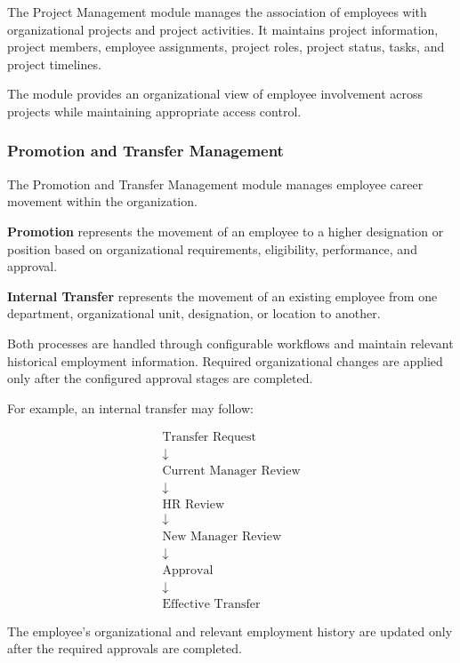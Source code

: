 \documentclass[12pt,a4paper]{article}
\begin{document}
The Project Management module manages the association of employees
with organizational projects and project activities. It maintains
project information, project members, employee assignments, project
roles, project status, tasks, and project timelines.

The module provides an organizational view of employee involvement
across projects while maintaining appropriate access control.

\subsubsection{Promotion and Transfer Management}

The Promotion and Transfer Management module manages employee
career movement within the organization.

\textbf{Promotion} represents the movement of an employee to a
higher designation or position based on organizational requirements,
eligibility, performance, and approval.

\textbf{Internal Transfer} represents the movement of an existing
employee from one department, organizational unit, designation, or
location to another.

Both processes are handled through configurable workflows and
maintain relevant historical employment information. Required
organizational changes are applied only after the configured
approval stages are completed.

For example, an internal transfer may follow:

\[
\begin{array}{c}
\text{Transfer Request} \\[4pt]
\downarrow \\[4pt]
\text{Current Manager Review} \\[4pt]
\downarrow \\[4pt]
\text{HR Review} \\[4pt]
\downarrow \\[4pt]
\text{New Manager Review} \\[4pt]
\downarrow \\[4pt]
\text{Approval} \\[4pt]
\downarrow \\[4pt]
\text{Effective Transfer}
\end{array}
\]

The employee's organizational and relevant employment history are
updated only after the required approvals are completed.
\end{document}
